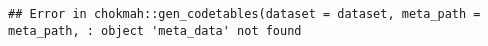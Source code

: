 \documentclass[
]{article}
\newenvironment{Shaded}{\begin{snugshade}}{\end{snugshade}}
\newcommand{\AttributeTok}[1]{\textcolor[rgb]{0.77,0.63,0.00}{#1}}
\newcommand{\FunctionTok}[1]{\textcolor[rgb]{0.00,0.00,0.00}{#1}}
\newcommand{\NormalTok}[1]{#1}
\newcommand{\OtherTok}[1]{\textcolor[rgb]{0.56,0.35,0.01}{#1}}
\newcommand{\SpecialCharTok}[1]{\textcolor[rgb]{0.00,0.00,0.00}{#1}}
\newcommand{\StringTok}[1]{\textcolor[rgb]{0.31,0.60,0.02}{#1}}
\begin{document}
\begin{minipage}[t]{0.7\linewidth}

\begin{Shaded}
\end{Shaded}

\begin{verbatim}
## Error in chokmah::gen_codetables(dataset = dataset, meta_path = meta_path, : object 'meta_data' not found
\end{verbatim}


\end{minipage}
\end{document}
